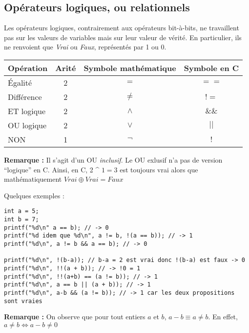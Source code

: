 \documentclass[../../../main.tex]{subfiles}
\begin{document}
\subsection{Opérateurs logiques, ou relationnels}
\label{sub:op_rateurs_logiques_ou_relationnels}

Les opérateurs logiques, contrairement aux opérateurs bit-à-bits, ne travaillent pas sur les valeurs de variables mais sur leur valeur de vérité. En particulier, ils ne renvoient que \textit{Vrai} ou \textit{Faux}, représentés par 1 ou 0.
\begin{center}
\begin{tabular}{l|c|c|c}
Opération & Arité & Symbole mathématique & Symbole en C \\
\hline
Égalité & 2 & $=$ & $==$ \\
Différence & 2 & $\neq$ & $!=$ \\
ET logique & 2 & $\wedge$ & $\&\&$ \\
OU logique & 2 & $\vee$ & $||$ \\
NON & 1 & $\neg$ & $!$
\end{tabular}
\end{center}
\textbf{Remarque :} Il s'agit d'un OU \textit{inclusif}. Le OU exlusif n'a pas de version ``logique'' en C. Ainsi, en C, 2 \textasciicircum{} $1 = 3$ est toujours vrai alors que mathématiquement $Vrai \oplus Vrai = Faux$
 
Quelques exemples :
\begin{verbatim}
int a = 5;
int b = 7;
printf("%d\n" a == b); // -> 0
printf("%d idem que %d\n", a != b, !(a == b)); // -> 1
printf("%d\n", a != b && a == b); // -> 0

printf("%d\n", !(b-a)); // b-a = 2 est vrai donc !(b-a) est faux -> 0
printf("%d\n", !!(a + b)); // -> !0 = 1
printf("%d\n", !!(a+b) == (a != b)); // -> 1
printf("%d\n", a == b || (a + b)); // -> 1
printf("%d\n", a-b && (a != b)); // -> 1 car les deux propositions sont vraies
\end{verbatim}
\textbf{Remarque :} On observe que pour tout entiers $a$ et $b$, $a-b\equiv a \neq b$. En effet, $a \neq b \Leftrightarrow a - b \neq{0}$
\end{document}
